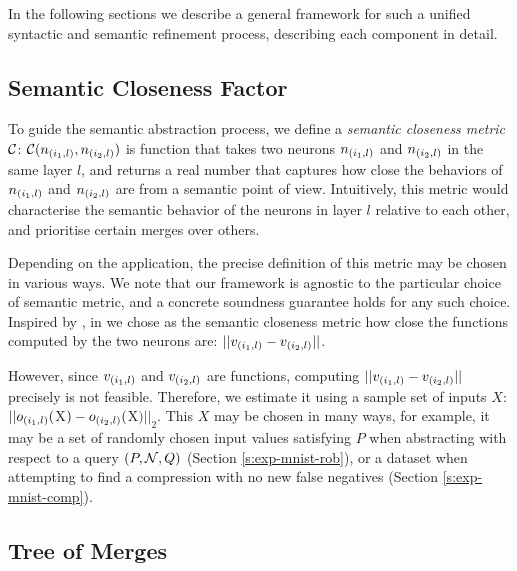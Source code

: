 In the following sections we describe a general framework for such a unified
syntactic and semantic refinement process, describing each component in detail.


\subsection{Semantic Closeness Factor}


To guide the semantic abstraction process, we define a \textit{semantic
closeness metric} $\mathcal{C}$: $\mathcal{C}(n_{(i_1,l)}, n_{(i_2,l)})$ is function that
takes two neurons $n_{(i_1,l)}$ and $n_{(i_2,l)}$ in
the same layer $l$, and returns a real number that
captures how close the behaviors of $n_{(i_1,l)}$ and $n_{(i_2,l)}$ are from a
semantic point of
view. Intuitively, this metric would characterise the semantic behavior of the
neurons in layer $l$ relative to each other, and prioritise certain merges over
others. 

Depending on the application, the precise definition of this metric may be
chosen in various ways. We note that our framework is agnostic to the particular
choice of semantic metric, and a concrete soundness guarantee holds for any such
choice. Inspired by \cite{deep-abstract}, in we chose as the
semantic closeness metric how close the functions computed by the two neurons
are: $||v_{(i_1,l)} - v_{(i_2,l)}||$. 

However, since $v_{(i_1,l)}$ and $v_{(i_2,l)}$ are functions, computing
$||v_{(i_1,l)} - v_{(i_2,l)}||$ precisely is not feasible.
Therefore, we estimate it using a sample set of inputs $X$: $||o_{(i_1,l)}($X$)
- o_{(i_2,l)}($X$)||_2$. This $X$ may be chosen in many ways, for example, it
may be a set of randomly chosen input values satisfying $P$ when
abstracting with respect to a query $(P, \mathcal{N}, Q)$
(Section \ref{s:exp-mnist-rob}), or a dataset when attempting to find a
compression with no new false negatives (Section \ref{s:exp-mnist-comp}).

\subsection{Tree of Merges}
\label{s:tree}

